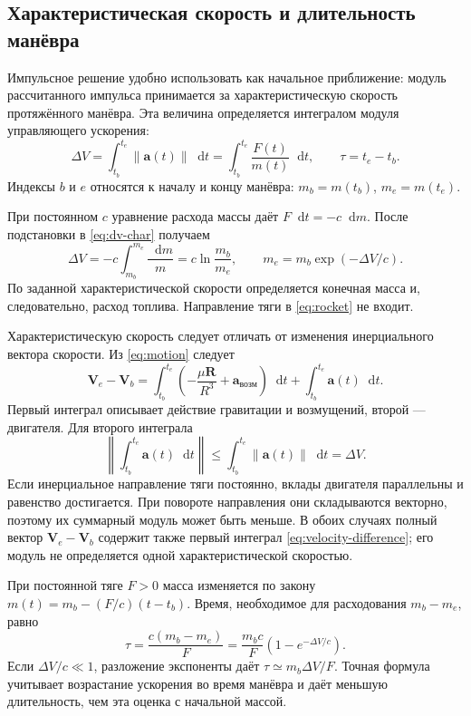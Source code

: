 \documentclass[a4paper,11pt]{article}
\newcommand{\dd}{\mathop{}\!\mathrm d}
\newcommand{\vect}[1]{\boldsymbol{#1}}
\newcommand{\norm}[1]{\left\lVert#1\right\rVert}
\numberwithin{equation}{section}
\begin{document}
\subsection{Характеристическая скорость и длительность манёвра}

Импульсное решение удобно использовать как начальное приближение:
модуль рассчитанного импульса принимается за характеристическую
скорость протяжённого манёвра. Эта величина определяется интегралом
модуля управляющего ускорения:
\begin{equation}
\Delta V=\int_{t_b}^{t_e}\norm{\vect a(t)}\dd t
        =\int_{t_b}^{t_e}\frac{F(t)}{m(t)}\dd t,
\qquad \tau=t_e-t_b.
\label{eq:dv-char}
\end{equation}
Индексы $b$ и $e$ относятся к началу и концу манёвра:
$m_b=m(t_b)$, $m_e=m(t_e)$.

При постоянном $c$ уравнение расхода массы даёт
$F\dd t=-c\dd m$. После подстановки в \eqref{eq:dv-char} получаем
\begin{equation}
\Delta V=-c\int_{m_b}^{m_e}\frac{\dd m}{m}
        =c\ln\frac{m_b}{m_e},
\qquad m_e=m_b\exp(-\Delta V/c).
\label{eq:rocket}
\end{equation}
По заданной характеристической скорости определяется конечная
масса и, следовательно, расход топлива. Направление тяги
в \eqref{eq:rocket} не входит.

Характеристическую скорость следует отличать от изменения
инерциального вектора скорости. Из \eqref{eq:motion} следует
\begin{equation}
\vect V_e-\vect V_b
=\int_{t_b}^{t_e}\left(-\frac{\mu\vect R}{R^3}
                   +\vect a_{\text{возм}}\right)\dd t
 +\int_{t_b}^{t_e}\vect a(t)\dd t.
\label{eq:velocity-difference}
\end{equation}
Первый интеграл описывает действие гравитации и возмущений,
второй --- двигателя. Для второго интеграла
\[
\left\|\int_{t_b}^{t_e}\vect a(t)\dd t\right\|
\leqslant\int_{t_b}^{t_e}\norm{\vect a(t)}\dd t=\Delta V.
\]
Если инерциальное направление тяги постоянно, вклады двигателя
параллельны и равенство достигается. При повороте направления
они складываются векторно, поэтому их суммарный модуль может
быть меньше. В обоих случаях полный вектор
$\vect V_e-\vect V_b$ содержит также первый интеграл
\eqref{eq:velocity-difference}; его модуль не определяется
одной характеристической скоростью.

При постоянной тяге $F>0$ масса изменяется по закону
$m(t)=m_b-(F/c)(t-t_b)$. Время, необходимое для расходования
$m_b-m_e$, равно
\begin{equation}
\boxed{\displaystyle
\tau=\frac{c(m_b-m_e)}{F}
    =\frac{m_bc}{F}\left(1-e^{-\Delta V/c}\right).}
\label{eq:duration}
\end{equation}
Если $\Delta V/c\ll1$, разложение экспоненты даёт
$\tau\simeq m_b\Delta V/F$.
Точная формула учитывает возрастание ускорения во время манёвра
и даёт меньшую длительность, чем эта оценка с начальной массой.
\end{document}

